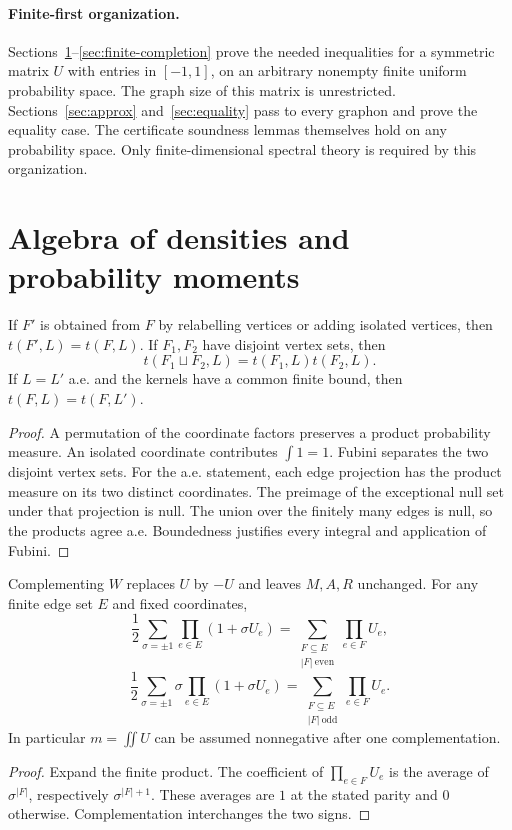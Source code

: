 \paragraph{Finite-first organization.}
Sections~\ref{sec:density-algebra}--\ref{sec:finite-completion} prove the needed inequalities
for a symmetric matrix $U$ with entries in $[-1,1]$, on an arbitrary nonempty finite uniform
probability space.  The graph size of this matrix is unrestricted.  Sections~\ref{sec:approx}
and~\ref{sec:equality} pass to every graphon and prove the equality case.  The certificate
soundness lemmas themselves hold on any probability space.  Only finite-dimensional
spectral theory is required by this organization.

\section{Algebra of densities and probability moments}
\label{sec:density-algebra}

\begin{lemma}
\label{lem:density-algebra}
\proved If $F'$ is obtained from $F$ by relabelling vertices or adding isolated vertices,
then $t(F',L)=t(F,L)$.  If $F_1,F_2$ have disjoint vertex sets, then
\[
 t(F_1\sqcup F_2,L)=t(F_1,L)t(F_2,L).
\]
If $L=L'$ a.e. and the kernels have a common finite bound, then $t(F,L)=t(F,L')$.
\end{lemma}
\begin{proof}
A permutation of the coordinate factors preserves a product probability measure.  An
isolated coordinate contributes $\int1=1$.  Fubini separates the two disjoint vertex sets.
For the a.e. statement, each edge projection has the product measure on its two distinct
coordinates.  The preimage of the exceptional null set under that projection is null.
The union over the finitely many edges is null, so the products agree a.e.  Boundedness
justifies every integral and application of Fubini.
\end{proof}

\begin{lemma}
\label{lem:parity}
\proved Complementing $W$ replaces $U$ by $-U$ and leaves $M,A,R$ unchanged.  For any finite
edge set $E$ and fixed coordinates,
\[
 \frac12\sum_{\sigma=\pm1}\prod_{e\in E}(1+\sigma U_e)
 =\sum_{\substack{F\subseteq E\\|F|\ \mathrm{even}}}\prod_{e\in F}U_e,
\]
\[
 \frac12\sum_{\sigma=\pm1}\sigma\prod_{e\in E}(1+\sigma U_e)
 =\sum_{\substack{F\subseteq E\\|F|\ \mathrm{odd}}}\prod_{e\in F}U_e.
\]
In particular $m=\iint U$ can be assumed nonnegative after one complementation.
\end{lemma}
\begin{proof}
Expand the finite product.  The coefficient of $\prod_{e\in F}U_e$ is the average of
$\sigma^{|F|}$, respectively $\sigma^{|F|+1}$.  These averages are $1$ at the stated parity
and $0$ otherwise.  Complementation interchanges the two signs.
\end{proof}

